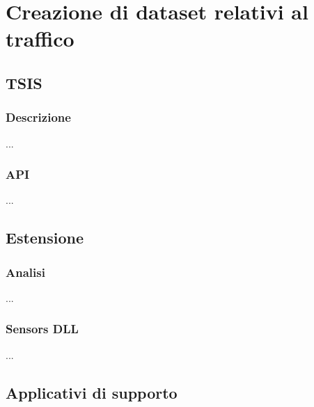 
\chapter{Creazione di dataset relativi al traffico}
\label{cap:dll-tsis}

\lipsum[1]

\section{TSIS}
\lipsum[1]

\subsection{Descrizione}
...

\subsection{API}
...

\section{Estensione}
\lipsum[2]

\subsection{Analisi}
...

\subsection{Sensors DLL}
...

\section{Applicativi di supporto}
\lipsum[4]
